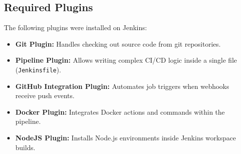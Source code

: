 \documentclass[12pt,a4paper]{article}
\begin{document}
\subsection{Required Plugins}
The following plugins were installed on Jenkins:
\begin{itemize}
    \item \textbf{Git Plugin:} Handles checking out source code from git repositories.
    \item \textbf{Pipeline Plugin:} Allows writing complex CI/CD logic inside a single file (\texttt{Jenkinsfile}).
    \item \textbf{GitHub Integration Plugin:} Automates job triggers when webhooks receive push events.
    \item \textbf{Docker Plugin:} Integrates Docker actions and commands within the pipeline.
    \item \textbf{NodeJS Plugin:} Installs Node.js environments inside Jenkins workspace builds.
\end{itemize}
\end{document}
